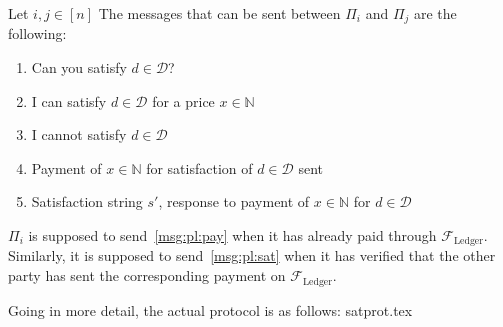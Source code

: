   Let $i, j \in \left[n\right]$ The messages that can be sent between $\Pi_i$ and $\Pi_j$
  are the following:
  \begin{enumerate}
    \item Can you satisfy $d \in \mathcal{D}$?
    \item I can satisfy $d \in \mathcal{D}$ for a price $x \in \mathbb{N}$
    \item I cannot satisfy $d \in \mathcal{D}$
    \item \label{msg:pl:pay} Payment of $x \in \mathbb{N}$ for satisfaction of $d \in \mathcal{D}$ sent
    \item \label{msg:pl:sat} Satisfaction string $s'$, response to payment of $x \in \mathbb{N}$ for $d \in
    \mathcal{D}$
  \end{enumerate}
  $\Pi_i$ is supposed to send~\ref{msg:pl:pay} when it has already paid through
  $\mathcal{F}_{\mathrm{Ledger}}$. Similarly, it is supposed to send~\ref{msg:pl:sat} when
  it has verified that the other party has sent the corresponding payment on
  $\mathcal{F}_{\mathrm{Ledger}}$.

  Going in more detail, the actual protocol is as follows:
  {satprot.tex}
